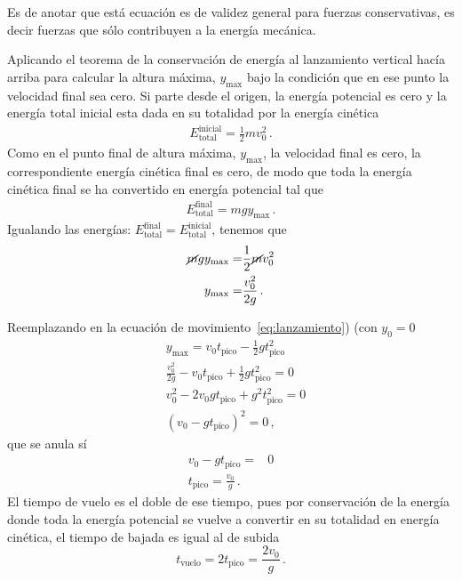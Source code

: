 \documentclass[11pt,a4paper]{book}
\begin{document}
Es de anotar que está ecuación es de validez general para fuerzas conservativas, es decir fuerzas que sólo contribuyen a la energía mecánica.

Aplicando el teorema de la conservación de energía al lanzamiento vertical hacía arriba para calcular la altura máxima, $y_{\text{max}}$ bajo la condición que en ese punto la velocidad final sea cero. Si parte desde el origen, la energía potencial es cero y la energía total inicial esta dada en su totalidad  por la energía cinética 
\begin{align}
    E_{\text{total}}^{\text{inicial}} = \frac{1}{2}mv_0^2\,. 
\end{align}
Como en el punto final de altura máxima, $y_{\text{max}}$, la velocidad final es cero, la correspondiente energía cinética final es cero, de modo que toda la energía cinética final se ha convertido en energía potencial tal que
\begin{align}
    E_{\text{total}}^{\text{final}} = mg y_{\text{max}}\,.
\end{align}
Igualando las energías: $E_{\text{total}}^{\text{final}}=E_{\text{total}}^{\text{inicial}}$, tenemos que
\begin{align}
\label{eq:ymax}
    \cancel{m}gy_{\text{max}} =& \frac{1}{2}\cancel{m}v_0^2\nonumber\\
    y_{\text{max}}=&\frac{v_0^2}{2g}\,.
\end{align}

Reemplazando en la ecuación de movimiento~\eqref{eq:lanzamiento}) (con $y_0=0$
\begin{align*}
    &y_{\text{max}}=v_0 t_{\text{pico}}-\frac{1}{2}gt_{\text{pico}}^2\\
    &\frac{v_0^2}{2g}-v_0t_{\text{pico}}+\frac{1}{2}gt_{\text{pico}}^2 =0\\
    &v_0^2-2v_0gt_{\text{pico}} +g^2t_{\text{pico}}^2=0\\
    &(v_0-gt_{\text{pico}})^2=0\,,
\end{align*}
que se anula sí
\begin{align}
\label{eq:tpico}
    v_0-gt_{\text{pico}}=&0\nonumber\\
    t_{\text{pico}}=\frac{v_0}{g}\,.
\end{align}
El tiempo de vuelo es el doble de ese tiempo, pues por conservación de la energía donde toda la energía potencial se vuelve a convertir en su totalidad en energía cinética, el tiempo de bajada es igual al de subida
\begin{equation}
\label{eq:tvuelo}
    t_{\text{vuelo}}=2t_{\text{pico}}=\frac{2v_0}{g}\,.
\end{equation}
\end{document}
